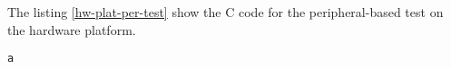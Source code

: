 \clearpage


The listing \ref{hw-plat-per-test} show the C code for the peripheral-based test on the hardware platform.\\[0.5cm]

\lstset{%
	numbers=left, %
	numberstyle=\tiny, %
	stepnumber=1, %
	numbersep=10pt, %
	language=C,%
	breaklines=true,                %
	breakatwhitespace=true,
	basicstyle=\footnotesize
}
\begin{lstlisting}[title={Peripheral test C Code},label=hw-plat-per-test, caption={[Prueba de la plataforma hardware con periféricos]Prueba de la plataforma hardware base donde se ejercitan los periféricos en especial los Leds y los Dip-Switches.}]
a
\end{lstlisting}

